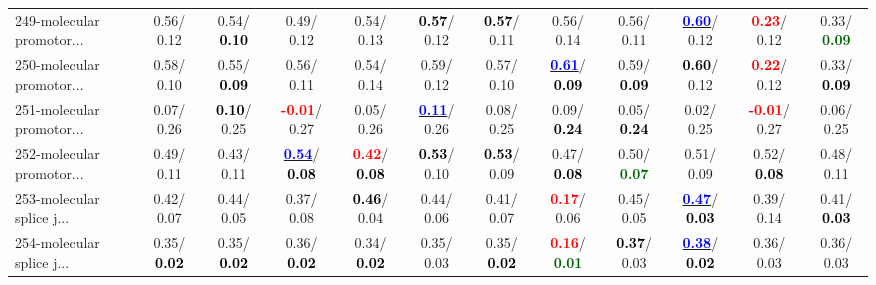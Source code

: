 \begin{table}[h]
\begin{center}
{\begin{tabular}{lc|c|c|c|c|c|c|c|c|c|c}
249-molecular promotor... &   0.56/  0.12 &   0.54/\textcolor{black}{\textbf{  0.10}} &   0.49/  0.12 &   0.54/  0.13 & \textcolor{black}{\textbf{  0.57}}/  0.12 & \textcolor{black}{\textbf{  0.57}}/  0.11 &   0.56/  0.14 &   0.56/  0.11 & \underline{\textcolor{blue}{\textbf{  0.60}}}/  0.12 & \textcolor{red}{\textbf{  0.23}}/  0.12 &   0.33/\textcolor{darkgreen}{\textbf{  0.09}} \\
250-molecular promotor... &   0.58/  0.10 &   0.55/\textcolor{black}{\textbf{  0.09}} &   0.56/  0.11 &   0.54/  0.14 &   0.59/  0.12 &   0.57/  0.10 & \underline{\textcolor{blue}{\textbf{  0.61}}}/\textcolor{black}{\textbf{  0.09}} &   0.59/\textcolor{black}{\textbf{  0.09}} & \textcolor{black}{\textbf{  0.60}}/  0.12 & \textcolor{red}{\textbf{  0.22}}/  0.12 &   0.33/\textcolor{black}{\textbf{  0.09}} \\
251-molecular promotor... &   0.07/  0.26 & \textcolor{black}{\textbf{  0.10}}/  0.25 & \textcolor{red}{\textbf{ -0.01}}/  0.27 &   0.05/  0.26 & \underline{\textcolor{blue}{\textbf{  0.11}}}/  0.26 &   0.08/  0.25 &   0.09/\textcolor{black}{\textbf{  0.24}} &   0.05/\textcolor{black}{\textbf{  0.24}} &   0.02/  0.25 & \textcolor{red}{\textbf{ -0.01}}/  0.27 &   0.06/  0.25 \\
252-molecular promotor... &   0.49/  0.11 &   0.43/  0.11 & \underline{\textcolor{blue}{\textbf{  0.54}}}/\textcolor{black}{\textbf{  0.08}} & \textcolor{red}{\textbf{  0.42}}/\textcolor{black}{\textbf{  0.08}} & \textcolor{black}{\textbf{  0.53}}/  0.10 & \textcolor{black}{\textbf{  0.53}}/  0.09 &   0.47/\textcolor{black}{\textbf{  0.08}} &   0.50/\textcolor{darkgreen}{\textbf{  0.07}} &   0.51/  0.09 &   0.52/\textcolor{black}{\textbf{  0.08}} &   0.48/  0.11 \\ \hline
253-molecular splice j... &   0.42/  0.07 &   0.44/  0.05 &   0.37/  0.08 & \textcolor{black}{\textbf{  0.46}}/  0.04 &   0.44/  0.06 &   0.41/  0.07 & \textcolor{red}{\textbf{  0.17}}/  0.06 &   0.45/  0.05 & \underline{\textcolor{blue}{\textbf{  0.47}}}/\textcolor{black}{\textbf{  0.03}} &   0.39/  0.14 &   0.41/\textcolor{black}{\textbf{  0.03}} \\
254-molecular splice j... &   0.35/\textcolor{black}{\textbf{  0.02}} &   0.35/\textcolor{black}{\textbf{  0.02}} &   0.36/\textcolor{black}{\textbf{  0.02}} &   0.34/\textcolor{black}{\textbf{  0.02}} &   0.35/  0.03 &   0.35/\textcolor{black}{\textbf{  0.02}} & \textcolor{red}{\textbf{  0.16}}/\textcolor{darkgreen}{\textbf{  0.01}} & \textcolor{black}{\textbf{  0.37}}/  0.03 & \underline{\textcolor{blue}{\textbf{  0.38}}}/\textcolor{black}{\textbf{  0.02}} &   0.36/  0.03 &   0.36/  0.03 \\

\end{tabular}}
\end{center}
\end{table}
